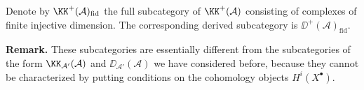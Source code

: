 \begin{definition*}
Denote by $\KK^+(\mathcal{A})_{\mathrm{fid}}$ the full subcategory of $\KK^+(\mathcal{A})$ consisting of complexes of finite injective dimension. The corresponding derived subcategory is $\DD^+(\mathcal{A})_{\mathrm{fid}}$.
\end{definition*}

\textbf{Remark.}
These subcategories are essentially different from the subcategories of the form $\KK_{\mathcal{A}'}(\mathcal{A})$ and $\DD_{\mathcal{A}'}(\mathcal{A})$ we have considered before, because they cannot be characterized by putting conditions on the cohomology objects $H^i(X^\bullet)$.
